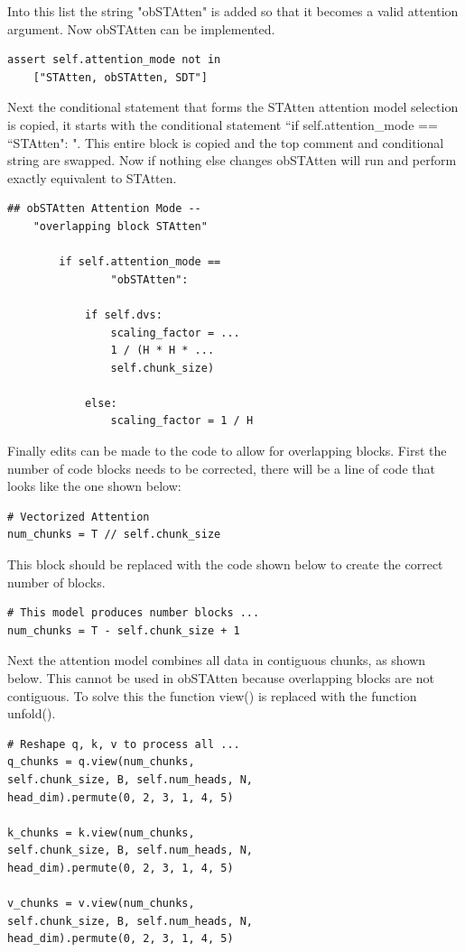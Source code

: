 \documentclass[../main.tex]{subfiles}
\begin{document}
\noindent Into this list the string "obSTAtten" is added so that it becomes a valid attention argument. Now obSTAtten can be implemented.
\begin{verbatim}
assert self.attention_mode not in 
	["STAtten, obSTAtten, SDT"]   
\end{verbatim}

\noindent Next the conditional statement that forms the STAtten attention model selection is copied, it starts with the conditional statement ``if self.attention\_mode == ``STAtten": ". This entire block is copied and the top comment and conditional string are swapped. Now if nothing else changes obSTAtten will run and perform exactly equivalent to STAtten.
\begin{verbatim}
## obSTAtten Attention Mode -- 
	"overlapping block STAtten"
        
        if self.attention_mode == 
        		"obSTAtten":
        		
            if self.dvs:
                scaling_factor = ...
                1 / (H * H * ...
                self.chunk_size)
                		
            else:
                scaling_factor = 1 / H
\end{verbatim}

\noindent Finally edits can be made to the code to allow for overlapping blocks. First the number of code blocks needs to be corrected, there will be a line of code that looks like the one shown below:
\begin{verbatim}
# Vectorized Attention
num_chunks = T // self.chunk_size  
\end{verbatim}

\noindent This block should be replaced with the code shown below to create the correct number of blocks.
\begin{verbatim}
# This model produces number blocks ...
num_chunks = T - self.chunk_size + 1
\end{verbatim}

\noindent Next the attention model combines all data in contiguous chunks, as shown below. This cannot be used in obSTAtten because overlapping blocks are not contiguous. To solve this the function view() is replaced with the function unfold().
\begin{verbatim}
# Reshape q, k, v to process all ...
q_chunks = q.view(num_chunks, 
self.chunk_size, B, self.num_heads, N, 
head_dim).permute(0, 2, 3, 1, 4, 5)

k_chunks = k.view(num_chunks, 
self.chunk_size, B, self.num_heads, N, 
head_dim).permute(0, 2, 3, 1, 4, 5)

v_chunks = v.view(num_chunks, 
self.chunk_size, B, self.num_heads, N, 
head_dim).permute(0, 2, 3, 1, 4, 5)
\end{verbatim}
\end{document}
